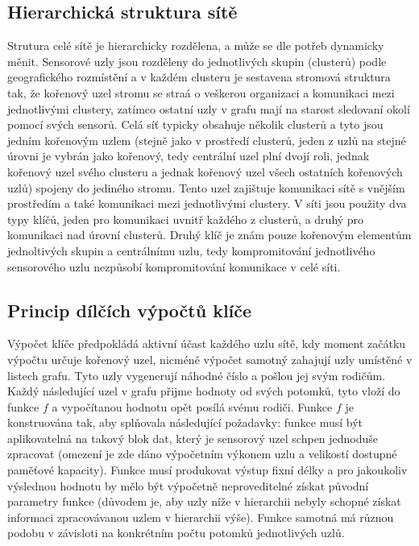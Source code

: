\documentclass[11pt,final,twoside]{fithesis2}
\begin{document}
\subsection{Hierarchická struktura sítě}
Strutura celé sítě je hierarchicky rozdělena, a může se dle potřeb dynamicky měnit. Sensorové uzly jsou rozděleny do jednotlivých skupin (clusterů) podle geografického rozmístění a 
v každém clusteru je sestavena stromová struktura tak, že kořenový uzel stromu se straá o veškerou organizaci a komunikaci mezi jednotlivými clustery, zatímco ostatní uzly v grafu 
mají na starost sledovaní okolí pomocí svých sensorů. Celá síť typicky obsahuje několik clusterů a tyto jsou jedním kořenovým uzlem (stejně jako v prostředí clusterů, jeden z uzlů na stejné
úrovni je vybrán jako kořenový, tedy centrální uzel plní dvojí roli, jednak kořenový uzel svého clusteru a jednak kořenový uzel všech ostatních kořenových uzlů)
spojeny do jediného stromu. Tento uzel zajištuje komunikaci sítě s vnějším prostředím a také komunikaci mezi jednotlivými clustery. V síti jsou použity dva typy klíčů, jeden pro 
komunikaci uvnitř každého z clusterů, a druhý pro komunikaci nad úrovní clusterů. Druhý klíč je znám pouze kořenovým elementům jednoltivých skupin a centrálnímu uzlu, tedy kompromitování 
jednotlivého sensorového uzlu nezpůsobí kompromitování komunikace v celé síti. 

\subsection{Princip dílčích výpočtů klíče}
Výpočet klíče předpokládá aktivní účast každého uzlu sítě, kdy moment začátku výpočtu určuje kořenový uzel, nicméně výpočet samotný zahajují uzly umístěné v listech grafu. 
Tyto uzly vygenerují náhodné číslo a pošlou jej svým rodičům. Každý následující uzel v grafu přijme hodnoty od svých potomků, tyto vloží do funkce $f$ a vypočítanou hodnotu opět 
posílá svému rodiči. Funkce $f$ je konstruována tak, aby splňovala následující požadavky: funkce musí být aplikovatelná na takový blok dat, který je sensorový uzel schpen jednoduše zpracovat
(omezení je zde dáno výpočetním výkonem uzlu a velikostí dostupné paměťové kapacity). Funkce musí produkovat výstup fixní délky a pro jakoukoliv výslednou hodnotu by mělo být výpočetně neproveditelné 
získat původní parametry funkce (důvodem je, aby uzly níže v hierarchii nebyly schopné získat informaci zpracovávanou uzlem v hierarchii výše).
Funkce samotná má různou podobu v závisloti na konkrétním počtu potomků jednotlivých uzlů. 
\end{document}
